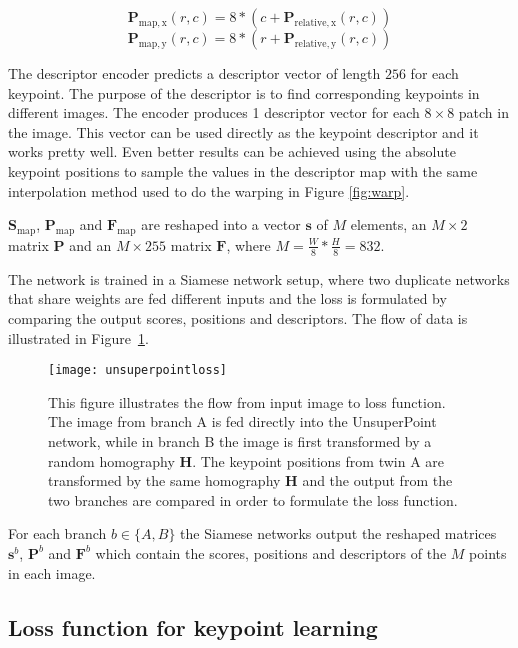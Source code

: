 \begin{equation}
\textbf{P}_{\mathrm{map,x}}(r,c) = 8 * (c + \textbf{P}_{\mathrm{relative,x}}(r,c))
\end{equation}
\begin{equation}
\textbf{P}_{\mathrm{map,y}}(r,c) = 8 * (r + \textbf{P}_{\mathrm{relative,y}}(r,c))
\end{equation}

The descriptor encoder predicts a descriptor vector of length $256$ for each keypoint. The purpose of the descriptor is to find corresponding keypoints in different images. The encoder produces 1 descriptor vector for each $8\times 8$ patch in the image. This vector can be used directly as the keypoint descriptor and it works pretty well. Even better results can be achieved using the absolute keypoint positions to sample the values in the descriptor map with the same interpolation method used to do the warping in Figure \ref{fig:warp}.

$\textbf{S}_{\textrm{map}}$, $\textbf{P}_{\mathrm{map}}$ and $\textbf{F}_{\mathrm{map}}$ are reshaped into a vector $\textbf{s}$ of $M$ elements, an $M\times 2$ matrix $\textbf{P}$ and an $M\times 255$ matrix $\textbf{F}$, where $M=\frac{W}{8}*\frac{H}{8}=832$.

The network is trained in a Siamese network setup, where two duplicate networks that share weights are fed different inputs and the loss is formulated by comparing the output scores, positions and descriptors. The flow of data is illustrated in Figure~\ref{fig:unsuperpointloss}.

\begin{figure}[H]
	\centering
	\texttt{[image: unsuperpointloss]}
	\caption{This figure illustrates the flow from input image to loss function. The image from branch A is fed directly into the UnsuperPoint network, while in branch B the image is first transformed by a random homography $\textbf{H}$. The keypoint positions from twin A are transformed by the same homography $\textbf{H}$ and the output from the two branches are compared in order to formulate the loss function.}
	\label{fig:unsuperpointloss}
\end{figure}

For each branch $b\in\{A,B\}$ the Siamese networks output the reshaped matrices $\textbf{s}^b$, $\textbf{P}^b$ and $\textbf{F}^b$ which contain the scores, positions and descriptors of the $M$ points in each image.

\subsection{Loss function for keypoint learning}\label{sec:keypointloss}

